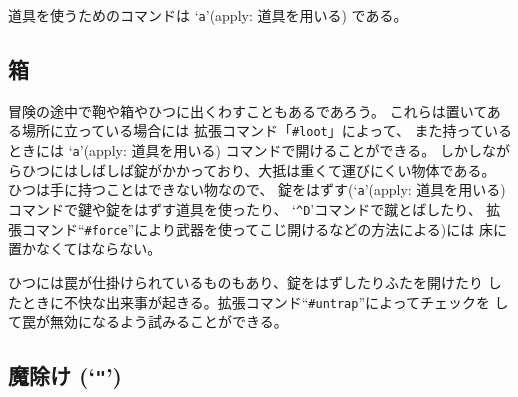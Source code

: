 道具を使うためのコマンドは `{\tt a}'(apply: 道具を用いる) である。

\subsection*{箱}

冒険の途中で鞄や箱やひつに出くわすこともあるであろう。
これらは置いてある場所に立っている場合には
拡張コマンド「{\tt \#loot}」によって、
また持っているときには `{\tt a}'(apply: 道具を用いる) コマンドで開けることができる。
しかしながらひつにはしばしば錠がかかっており、大抵は重くて運びにくい物体である。
ひつは手に持つことはできない物なので、
錠をはずす(`{\tt a}'(apply: 道具を用いる) コマンドで鍵や錠をはずす道具を使ったり、
`{\tt \^{}D}'コマンドで蹴とばしたり、
拡張コマンド``{\tt \#force}''により武器を使ってこじ開けるなどの方法による)には
床に置かなくてはならない。

ひつには罠が仕掛けられているものもあり、錠をはずしたりふたを開けたり
したときに不快な出来事が起きる。拡張コマンド``{\tt \#untrap}''によってチェックを
して罠が無効になるよう試みることができる。

\subsection*{魔除け (`{\tt "}')}

